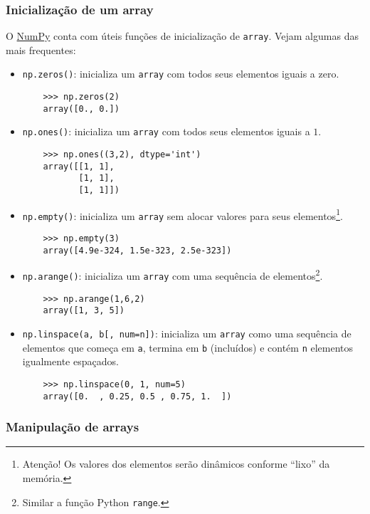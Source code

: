 \documentclass[12pt]{article}
\begin{document}
\subsubsection{Inicialização de um array}

O \href{https://numpy.org/}{NumPy} conta com úteis funções de inicialização de \lstinline+array+. Vejam algumas das mais frequentes:
\begin{itemize}
\item \lstinline+np.zeros()+: inicializa um \lstinline+array+ com todos seus elementos iguais a zero.
  \begin{lstlisting}
    >>> np.zeros(2)
    array([0., 0.])
  \end{lstlisting}
\item \lstinline+np.ones()+: inicializa um \lstinline+array+ com todos seus elementos iguais a $1$.
  \begin{lstlisting}
    >>> np.ones((3,2), dtype='int')
    array([[1, 1],
           [1, 1],
           [1, 1]])
  \end{lstlisting}
\item \lstinline+np.empty()+: inicializa um \lstinline+array+ sem alocar valores para seus elementos\footnote{Atenção! Os valores dos elementos serão dinâmicos conforme ``lixo'' da memória.}.
  \begin{lstlisting}
    >>> np.empty(3)
    array([4.9e-324, 1.5e-323, 2.5e-323])
  \end{lstlisting}
\item \lstinline+np.arange()+: inicializa um \lstinline+array+ com uma sequência de elementos\footnote{Similar a função Python \lstinline+range+.}.
  \begin{lstlisting}
    >>> np.arange(1,6,2)
    array([1, 3, 5])
  \end{lstlisting}
\item \lstinline+np.linspace(a, b[, num=n])+: inicializa um \lstinline+array+ como uma sequência de elementos que começa em \lstinline+a+, termina em \lstinline+b+ (incluídos) e contém \lstinline+n+ elementos igualmente espaçados.
  \begin{lstlisting}
    >>> np.linspace(0, 1, num=5)
    array([0.  , 0.25, 0.5 , 0.75, 1.  ])
  \end{lstlisting}
\end{itemize}

\subsubsection{Manipulação de arrays}
\end{document}
